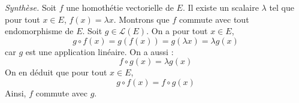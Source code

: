 \documentclass[a4paper,10pt]{report}
\begin{document}
\begin{enumerate}
\medskip

\noindent \textit{Synthèse.} Soit $f$ une homothétie vectorielle de $E$. Il existe un scalaire $\lambda$ tel que pour tout $x \in E$, $f(x)= \lambda x$. Montrons que $f$ commute avec tout endomorphisme de $E$. Soit $g \in \mathcal{L}(E)$. On a pour tout $x \in E$,
$$ g \circ f(x) = g (f(x)) = g(\lambda x)= \lambda g(x)$$
car $g$ est une application linéaire. On a aussi :
$$ f \circ g(x) = \lambda g(x)$$
On en déduit que pour tout $x \in E$,
$$ g \circ f(x) = f \circ g(x)$$
Ainsi, $f$ commute avec $g$.
\end{enumerate}








%
%
%
%
%
%
%
%

%    
%

%
%
\end{document}
